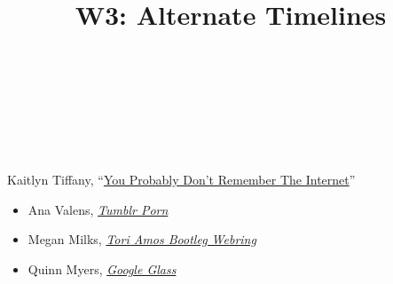\documentclass[
  letterpaper,
  DIV=11,
  numbers=noendperiod,
  oneside]{scrartcl}
\title{W3: Alternate Timelines}
\author{}
\date{}
\providecommand{\tightlist}{%
  \setlength{\itemsep}{0pt}\setlength{\parskip}{0pt}}\usepackage{longtable,booktabs,array}
\begin{document}
\maketitle
\ifdefined\Shaded\renewenvironment{Shaded}{\begin{tcolorbox}[interior hidden, borderline west={3pt}{0pt}{shadecolor}, enhanced, boxrule=0pt, frame hidden, sharp corners, breakable]}{\end{tcolorbox}}\fi

\begin{figure}

\begin{minipage}[t]{0.24\linewidth}

{\centering 


}

\end{minipage}%
%
\begin{minipage}[t]{0.01\linewidth}

{\centering 

~

}

\end{minipage}%
%
\begin{minipage}[t]{0.01\linewidth}

{\centering 

~

}

\end{minipage}%
%
\begin{minipage}[t]{0.01\linewidth}

{\centering 

~

}

\end{minipage}%

\end{figure}

Kaitlyn Tiffany,
``\href{https://canvas.emerson.edu/courses/1932613/files/145219877?wrap=1}{You
Probably Don't Remember The Internet}''

\begin{itemize}
\tightlist
\item
  Ana Valens,
  \href{http://www.instarbooks.com/books/tumblr-porn.html}{\emph{Tumblr
  Porn}}
\item
  Megan Milks,
  \href{http://www.instarbooks.com/books/tori-amos-bootleg-webring.html}{\emph{Tori
  Amos Bootleg Webring}}
\item
  Quinn Myers,
  \href{http://www.instarbooks.com/books/google-glass.html}{\emph{Google
  Glass}}
\end{itemize}
\end{document}
